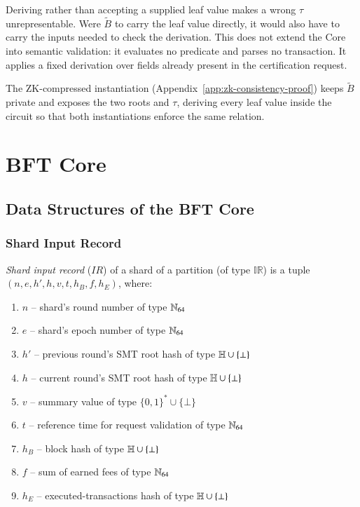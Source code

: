 Deriving rather than accepting a supplied leaf value makes a wrong $\tau$ unrepresentable. Were $\widetilde B$ to carry the leaf value directly, it would also have to carry the inputs needed to check the derivation. This does not extend the Core into semantic validation: it evaluates no predicate and parses no transaction. It applies a fixed derivation over fields already present in the certification request.

The ZK-compressed instantiation (Appendix~\ref{app:zk-consistency-proof}) keeps $\widetilde B$ private and exposes the two roots and $\tau$, deriving every leaf value inside the circuit so that both instantiations enforce the same relation.



\chapter{BFT Core}

\section{Data Structures of the BFT Core}

\subsection{Shard Input Record}\label{shard-input-record}

\emph{Shard input record} ($IR$) of a shard of a partition (of type $\mathbb{IR}$) is a tuple $(n, e, h', h, v, t, h_B, f, h_E)$, where:
\begin{enumerate}
	\item $n$ -- shard's round number of type $\mathbb{N}_{64}$
	\item $e$ -- shard's epoch number of type $\mathbb{N}_{64}$
	\item $h'$ -- previous round's SMT root hash of type $\mathbb{H}\cup\{\bot\}$
	\item $h$ -- current round's SMT root hash of type $\mathbb{H}\cup\{\bot\}$
	\item $v$ -- summary value of type $\{0,1\}^*\cup\{\bot\}$
	\item $t$ -- reference time for request validation of type $\mathbb{N}_{64}$
	\item $h_B$ -- block hash of type $\mathbb{H}\cup\{\bot\}$
	\item $f$ -- sum of earned fees of type $\mathbb{N}_{64}$
	\item $h_E$ -- executed-transactions hash of type $\mathbb{H}\cup\{\bot\}$
\end{enumerate}


